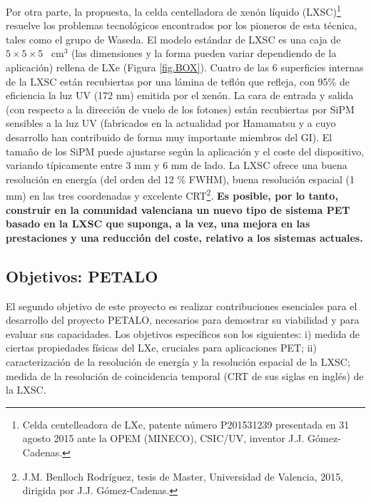 Por otra parte, la propuesta, la celda centelladora de xenón líquido (LXSC)\footnote{Celda centelleadora de LXe, patente número P201531239 presentada en 31 agosto 2015 ante la OPEM (MINECO), CSIC/UV, inventor J.J. Gómez-Cadenas.} resuelve los problemas tecnológicos encontrados por los pioneros de esta técnica, tales como el grupo de Waseda. El modelo estándar de LXSC es una caja de $5\times 5 \times 5$~ cm$^3$ (las dimensiones y la forma pueden variar dependiendo de la aplicación) rellena de LXe (Figura \ref{fig.BOX}). Cuatro de las 6 superficies internas de la LXSC están recubiertas por una lámina de teflón que refleja, con 95\% de eficiencia la luz UV (172 nm) emitida por el xenón. La cara de entrada y salida (con respecto a la dirección de vuelo de los fotones) están recubiertas por SiPM sensibles a la luz UV (fabricados en la actualidad por Hamamatsu y a cuyo desarrollo han contribuido de forma muy importante miembros del GI). El tamaño de los SiPM puede ajustarse según la aplicación y el coste del dispositivo, variando típicamente entre 3 mm y 6 mm de lado. La LXSC ofrece una buena resolución en energía (del orden del 12 \% FWHM), buena resolución espacial (1 mm) en las tres coordenadas y excelente CRT\footnote{J.M. Benlloch Rodríguez, tesis de Master, Universidad de Valencia, 2015, dirigida por J.J. Gómez-Cadenas. 
}. {\bf Es posible, por lo tanto, construir en la comunidad valenciana un nuevo tipo de sistema PET basado en la LXSC que suponga, a la vez, una mejora en las prestaciones y una reducción del coste, relativo a los sistemas actuales.}

\subsection*{Objetivos: PETALO}

El segundo objetivo de este proyecto es realizar contribuciones esenciales para el desarrollo del proyecto PETALO, necesarios para demostrar su viabilidad y para evaluar sus capacidades. Los objetivos específicos son los siguientes: i) medida de ciertas propiedades físicas del LXe, cruciales para aplicaciones PET;  ii) caracterización de la resolución de energía y la resolución espacial de la LXSC; medida de la resolución de coincidencia temporal (CRT de sus siglas en inglés) de la LXSC.


